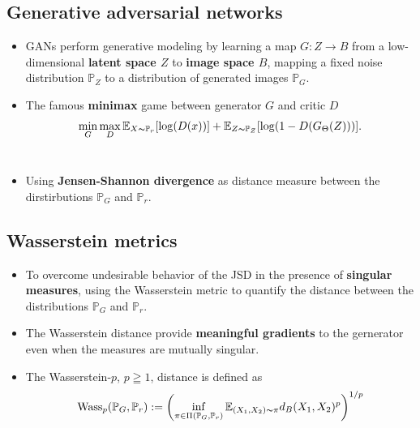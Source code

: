 \documentclass[landscape,headrule,footrule]{foils}
\begin{document}
\subsection{Generative adversarial networks}
\tableofcontents
\begin{frame}
\begin{flushleft}
\begin{itemize}
\item GANs perform generative modeling by learning a map $G : Z\rightarrow B$ from a low-dimensional \textbf{latent space $Z$} to \textbf{image space $B$}, mapping a fixed noise distribution $\mathbb{P}_{Z}$ to a distribution of generated images $\mathbb{P}_{G}$. \\
\item The famous \textbf{minimax} game between generator $G$ and critic $D$
\begin{equation}
\mathop{\min}_{G} \mathop{\max}_{D} \mathbb{E}_{X\thicksim\mathbb{P}_{r}} [\log (D(x))]+ \mathbb{E}_{Z\thicksim\mathbb{P}_{Z}}[\log (1-D(G_{\Theta}(Z)))].
\end{equation}
\\
\item Using \textbf{Jensen-Shannon divergence} as distance measure between the dirstirbutions $\mathbb{P}_{G}$ and $\mathbb{P}_{r}$.
\end{itemize}
\end{flushleft}
\end{frame}

\subsection{Wasserstein metrics}
\tableofcontents
\begin{frame}
\begin{flushleft}
\begin{itemize}
\item To overcome undesirable behavior of the JSD in the presence of \textbf{singular measures}, using the Wasserstein metric to quantify the distance between the distributions $\mathbb{P}_{G}$ and $\mathbb{P}_{r}$. \\
\item The Wasserstein distance provide \textbf{meaningful gradients} to the gernerator even when the measures are mutually singular. \\
\item The Wasserstein-$p$, $p\geqq 1$, distance is defined as
\begin{equation}
{\rm Wass}_p(\mathbb{P}_{G},\mathbb{P}_{r}):= \left(\mathop{\inf}_{\pi\in\Pi(\mathbb{P}_{G}, \mathbb{P}_{r})} \mathbb{E}_{(X_1,X_2)\thicksim \pi} d_B(X_1,X_2)^p \right)^{1/p}
\end{equation}

\end{itemize}
\end{flushleft}
\end{frame}
\end{document}
